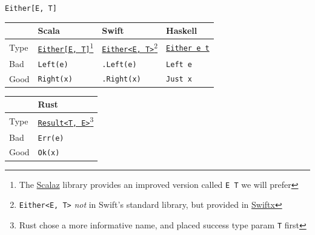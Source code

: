\begin{frame}{\texttt{Either[E, T]}}
  \begin{table}
    \begin{tabular}{| l | l | l | l |}
      \toprule
      & Scala & Swift & Haskell \\
      \midrule
      Type &
             \href{http://www.scala-lang.org/api/current/index.html\#scala.Either}{\texttt{Either[E, T]}}\footnote{The \href{https://github.com/scalaz/scalaz}{Scalaz} library provides an improved version called \texttt{E \/ T} we will prefer} &
        \href{https://github.com/typelift/Swiftx/blob/master/Swiftx/Either.swift}{\texttt{Either<E, T>}}\footnote{\texttt{Either<E, T>} \emph{not} in Swift's standard library, but provided in \href{https://github.com/typelift/Swiftx}{Swiftx}} &
        \href{http://hackage.haskell.org/package/base-4.8.0.0/docs/Data-Either.html}{\texttt{Either e t}} \\
      \midrule
      Bad & \texttt{Left(e)} &
        \texttt{.Left(e)} &
        \texttt{Left e} \\
      Good & \texttt{Right(x)} &
        \texttt{.Right(x)} &
        \texttt{Just x} \\
      \bottomrule
    \end{tabular}
  \end{table}

  \begin{table}
    \begin{tabular}{| l | l |}
      \toprule
      & Rust \\
      \midrule
      Type &
        \href{http://doc.rust-lang.org/1.0.0-beta/std/result/enum.Result.html}{\texttt{Result<T, E>}}\footnote{Rust chose a more informative name, and placed success type param \texttt{T} first} \\
      \midrule
      Bad & \texttt{Err(e)} \\
      Good & \texttt{Ok(x)} \\
      \bottomrule
    \end{tabular}
  \end{table}

\end{frame}

